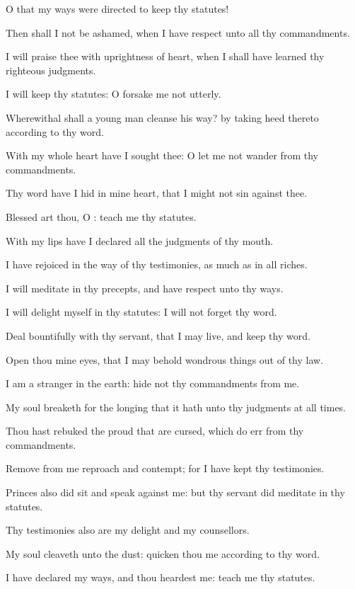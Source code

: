 \Verse O that my ways were directed to keep thy statutes!

\Verse Then shall I not be ashamed, when I have respect unto all thy commandments.

\Verse I will praise thee with uprightness of heart, when I shall have learned thy righteous judgments.

\Verse I will keep thy statutes: O forsake me not utterly.

\Verse Wherewithal shall a young man cleanse his way? by taking heed thereto according to thy word.

\Verse With my whole heart have I sought thee: O let me not wander from thy commandments.

\Verse Thy word have I hid in mine heart, that I might not sin against thee.

\Verse Blessed art thou, O \LORD: teach me thy statutes.

\Verse With my lips have I declared all the judgments of thy mouth.

\Verse I have rejoiced in the way of thy testimonies, as much as in all riches.

\Verse I will meditate in thy precepts, and have respect unto thy ways.

\Verse I will delight myself in thy statutes: I will not forget thy word.

\Verse Deal bountifully with thy servant, that I may live, and keep thy word.

\Verse Open thou mine eyes, that I may behold wondrous things out of thy law.

\Verse I am a stranger in the earth: hide not thy commandments from me.

\Verse My soul breaketh for the longing that it hath unto thy judgments at all times.

\Verse Thou hast rebuked the proud that are cursed, which do err from thy commandments.

\Verse Remove from me reproach and contempt; for I have kept thy testimonies.

\Verse Princes also did sit and speak against me: but thy servant did meditate in thy statutes.

\Verse Thy testimonies also are my delight and my counsellors.

\Verse My soul cleaveth unto the dust: quicken thou me according to thy word.

\Verse I have declared my ways, and thou heardest me: teach me thy statutes.

